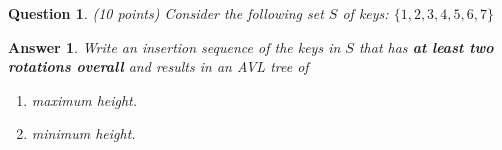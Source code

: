 \documentclass[a4paper]{article}
\theoremstyle{remarksStyle}
\theoremstyle{questionStyle}
\newtheorem{question}{Question}
\theoremstyle{answerStyle}
\newtheorem{answer}{Answer}
\begin{document}
\begin{question} (10 points)
Consider the following set $S$ of keys: $\{ 1,2,3,4,5,6,7 \} $
\end{question}
\begin{answer}
     Write an insertion sequence of the keys in $S$ that has \textbf{at least two rotations overall} and results in an AVL tree of  
         \begin{enumerate}
             \item[(i)] maximum height.
              \item[(ii)]  minimum height.
           \end{enumerate}
\end{answer}
\end{document}
